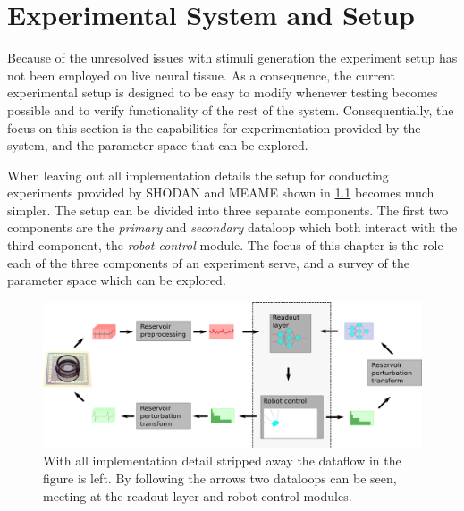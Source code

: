 \chapter{Experimental System and Setup}
Because of the unresolved issues with stimuli generation the experiment setup has not been
employed on live neural tissue.
As a consequence, the current experimental setup is designed to be easy to
modify whenever testing becomes possible and to verify functionality of the rest
of the system.
Consequentially, the focus on this section is the capabilities for experimentation
provided by the system, and the parameter space that can be explored.\par
%
When leaving out all implementation details the setup for conducting experiments
provided by SHODAN and MEAME shown in \ref{figExperimentLoop} becomes much simpler.
The setup can be divided into three separate components.
The first two components are the \emph{primary} and \emph{secondary} dataloop
which both interact with the third component, the \emph{robot control} module.
The focus of this chapter is the role each of the three components of an
experiment serve, and a survey of the parameter space which can be explored. 
\begin{figure}[h!]
  \centering
  \includegraphics[width=1\textwidth]{fig/experimentLoopFull.png}
  \caption{
    With all implementation detail stripped away the dataflow in the figure is
    left.
    By following the arrows two dataloops can be seen, meeting at the readout
    layer and robot control modules.
  }
  \label{figExperimentLoop}
\end{figure}
%

